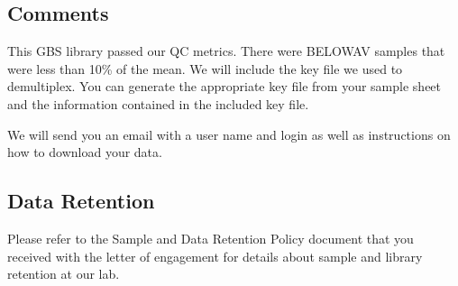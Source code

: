 \documentclass[hidelinks,12pt]{article}
\begin{document}
\subsection*{Comments}

This GBS library passed our QC metrics. 
There were BELOWAV samples that were less than 10\% of the mean. 
We will include the key file we used to demultiplex. 
You can generate the appropriate key file from your sample sheet and the information contained in the included key file.


We will send you an email with a user name and login as well as instructions on how to download your data.

\subsection*{Data Retention}

Please refer to the Sample and Data Retention Policy document that you received with the letter of engagement for details about sample and library retention at our lab.
\end{document}
